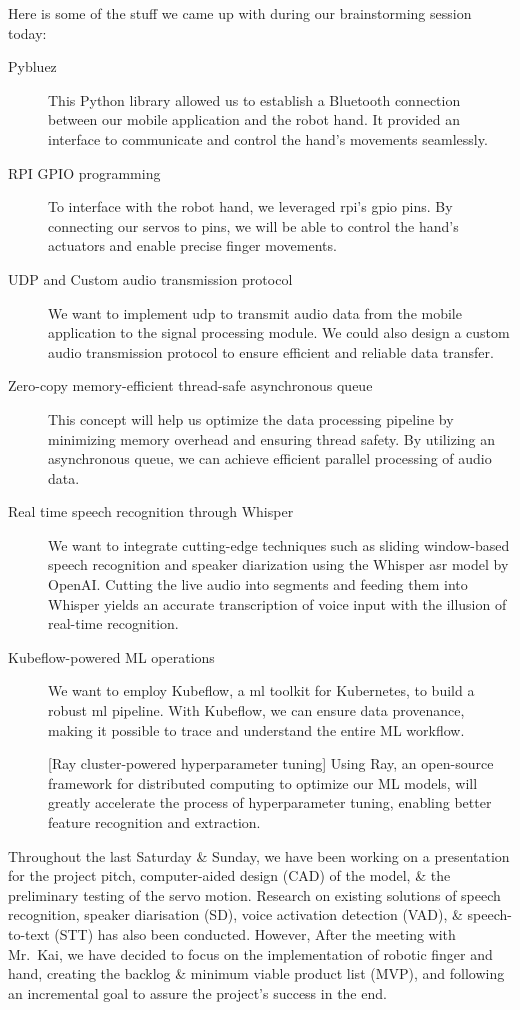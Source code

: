 Here is some of the stuff we came up with during our brainstorming session today:
\begin{description}
\item[Pybluez] This Python library allowed us to establish a Bluetooth connection between our mobile application and the robot hand. It provided an interface to communicate and control the hand's movements seamlessly.

\item[RPI GPIO programming] To interface with the robot hand, we leveraged \gls{rpi}'s \gls{gpio} pins. By connecting our servos to pins, we will be able to control the hand's actuators and enable precise finger movements.

\item[UDP and Custom audio transmission protocol] We want to implement \gls{udp} to transmit audio data from the mobile application to the signal processing module. We could also design a custom audio transmission protocol to ensure efficient and reliable data transfer.

\item[Zero-copy memory-efficient thread-safe asynchronous queue] This concept will help us optimize the data processing pipeline by minimizing memory overhead and ensuring thread safety. By utilizing an asynchronous queue, we can achieve efficient parallel processing of audio data.

\item[Real time speech recognition through Whisper] We want to integrate cutting-edge techniques such as sliding window-based speech recognition and speaker diarization using the Whisper \gls{asr} model by OpenAI. Cutting the live audio into segments and feeding them into Whisper yields an accurate transcription of voice input with the illusion of real-time recognition.

\item[Kubeflow-powered ML operations] We want to employ Kubeflow, a \gls{ml} toolkit for Kubernetes, to build a robust \gls{ml} pipeline. With Kubeflow, we can ensure data provenance, making it possible to trace and understand the entire ML workflow.

[Ray cluster-powered hyperparameter tuning] Using Ray, an open-source framework for distributed computing to optimize our ML models, will greatly accelerate the process of hyperparameter tuning, enabling better feature recognition and extraction.
\end{description}
\newpage


Throughout the last Saturday \& Sunday, we have been working on a presentation for the project pitch, computer-aided design (CAD) of the model, \& the preliminary testing of the servo motion. Research on existing solutions of speech recognition, speaker diarisation (SD), voice activation detection (VAD), \& speech-to-text (STT) has also been conducted. However, After the meeting with Mr.~Kai, we have decided to focus on the implementation of robotic finger and hand, creating the backlog \& minimum viable product list (MVP), and following an incremental goal to assure the project's success in the end.

\newpage